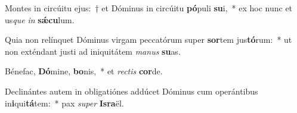 \item Montes in circúitu ejus:~† et Dóminus in circúitu \textbf{pó}puli \textbf{su}i,~* ex hoc nunc et us\textit{que} \textit{in} \textbf{sǽ}\textbf{cu}lum.
\item Quia non relínquet Dóminus virgam peccatórum super \textbf{sor}tem jus\textbf{tó}rum:~* ut non exténdant justi ad iniquitátem \textit{ma}\textit{nus} \textbf{su}as.
\item Bénefac, \textbf{Dó}mine, \textbf{bo}nis,~* et \textit{rec}\textit{tis} \textbf{cor}de.
\item Declinántes autem in obligatiónes addúcet Dóminus cum operántibus in\textbf{i}qui\textbf{tá}tem:~* pax \textit{su}\textit{per} \textbf{Is}\textbf{ra}ël.
